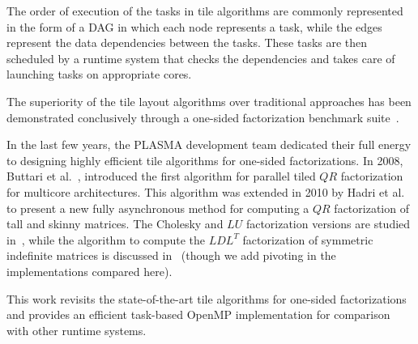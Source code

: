 The order of execution of the tasks in tile algorithms are commonly
represented in the form of a DAG in which each node represents a task, while
the edges represent the data dependencies between the tasks.  These
tasks are then scheduled by a runtime system that checks the
dependencies and takes care of launching tasks on appropriate cores.

The superiority of the tile layout algorithms over traditional
approaches has been demonstrated conclusively through a one-sided
factorization benchmark suite~\cite{agullo2009comparative}.

In the last few years,
the PLASMA development team dedicated their full
energy to designing highly efficient tile
algorithms for one-sided factorizations.
In 2008, Buttari et al.~\cite{buttari2008parallel},
introduced the first algorithm for parallel tiled $QR$ factorization for
multicore architectures.
This algorithm was extended in 2010 by
Hadri et al.~\cite{hadri2010tile} to present a new fully asynchronous
method for computing a $QR$ factorization of tall and skinny matrices.
The Cholesky and $LU$ factorization versions are studied
in~\cite{DBLP:journals/corr/abs-0709-1272}, while the algorithm to
compute the $LDL^T$ factorization of symmetric indefinite matrices is
discussed in~\cite{becker2011towards}
(though we add pivoting in the implementations compared here).

This work revisits the state-of-the-art tile algorithms for
one-sided factorizations and provides an
efficient task-based OpenMP implementation for comparison with
other runtime systems.
